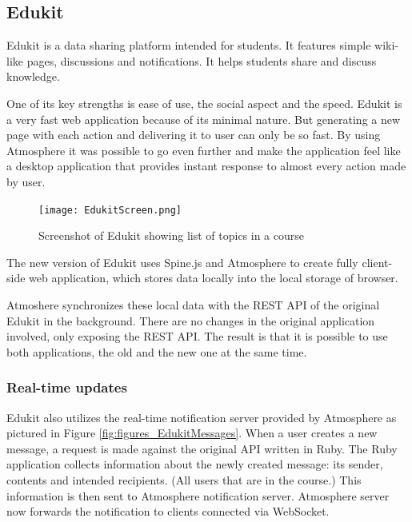 \subsection{Edukit}
\label{sec:edukit}


Edukit is a data sharing platform intended for students. It features simple wiki-like pages, discussions and notifications. It helps students share and discuss knowledge. 

One of its key strengths is ease of use, the social aspect and the speed. Edukit is a very fast web application because of its minimal nature. But generating a new page with each action and delivering it to user can only be so fast. By using Atmosphere it was possible to go even further and make the application feel like a desktop application that provides instant response to almost every action made by user. 

\begin{figure}[htbp]
  \centering
    \texttt{[image: EdukitScreen.png]}
  \caption{Screenshot of Edukit showing list of topics in a course}
  \label{fig:figures_EdukitScreen}
\end{figure}

The new version of Edukit uses Spine.js and Atmosphere to create fully client-side web application, which stores data locally into the local storage of browser.

Atmoshere synchronizes these local data with the REST API of the original Edukit in the background. There are no changes in the original application involved, only exposing the REST API. The result is that it is possible to use both applications, the old and the new one at the same time.

\subsubsection{Real-time updates}

Edukit also utilizes the real-time notification server provided by Atmosphere as pictured in Figure \ref{fig:figures_EdukitMessages}. When a user creates a new message, a request is made against the original API written in Ruby.  The Ruby application collects information about the newly created message: its sender, contents and intended recipients. (All users that are in the course.) This information is then sent to Atmosphere notification server.  Atmosphere server now forwards the notification to clients connected via WebSocket. 

